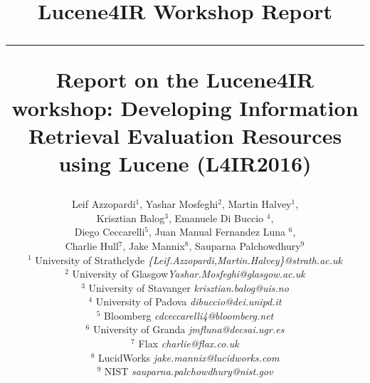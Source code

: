 \documentclass[12pt]{article}
\begin{document}
\title{\vspace{-2.5cm}
\begin{center}
\textbf{\small{Lucene4IR Workshop Report}}\\\vspace{-0.5cm} \rule{17.5cm}{1pt}
\end{center}
\vspace{1cm}\textbf{Report on the Lucene4IR workshop: Developing Information Retrieval Evaluation Resources using Lucene (L4IR2016) }}

\newcommand{\todo}[1]{\textcolor{red}{#1}}
\author{
Leif Azzopardi$^{1}$, Yashar Mosfeghi$^{2}$, Martin Halvey$^{1}$, \\
Krisztian Balog$^{3}$, Emanuele Di Buccio $^{4}$, \\
Diego Ceccarelli$^{5}$,
Juan Manual Fernandez Luna $^{6}$,\\
 Charlie Hull$^{7}$, Jake Mannix$^{8}$, Sauparna Palchowdhury$^{9}$\\
    $^{1}$ {\small University of Strathclyde  \emph{ \{Leif.Azzopardi,Martin.Halvey\}@strath.ac.uk}}\\
    $^{2}$ {\small University of Glasgow\emph{\small Yashar.Mosfeghi@glasgow.ac.uk}}\\
	$^{3}$ {\small University of Stavanger \emph{\small krisztian.balog@uis.no}}\\
	$^{4}$ {\small University of Padova \emph{\small dibuccio@dei.unipd.it}}\\
	$^{5}$ {\small Bloomberg \emph{\small cdceccarelli4@bloomberg.net}}\\	
	$^{6}$ {\small University of Granda \emph{\small jmfluna@decsai.ugr.es}}\\
	$^{7}$ {\small Flax \emph{\small charlie@flax.co.uk}}\\
	$^{8}$ {\small LucidWorks \emph{\small jake.mannix@lucidworks.com}}\\
	$^{9}$ {\small NIST \emph{\small sauparna.palchowdhury@nist.gov}}
}
\end{document}

